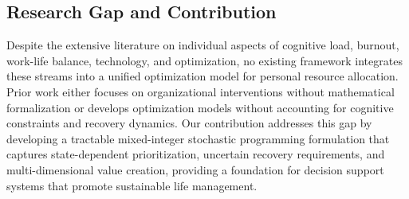 \subsection{Research Gap and Contribution}

Despite the extensive literature on individual aspects of cognitive load, burnout, work-life balance, technology, and optimization, no existing framework integrates these streams into a unified optimization model for personal resource allocation. Prior work either focuses on organizational interventions without mathematical formalization or develops optimization models without accounting for cognitive constraints and recovery dynamics. Our contribution addresses this gap by developing a tractable mixed-integer stochastic programming formulation that captures state-dependent prioritization, uncertain recovery requirements, and multi-dimensional value creation, providing a foundation for decision support systems that promote sustainable life management.
